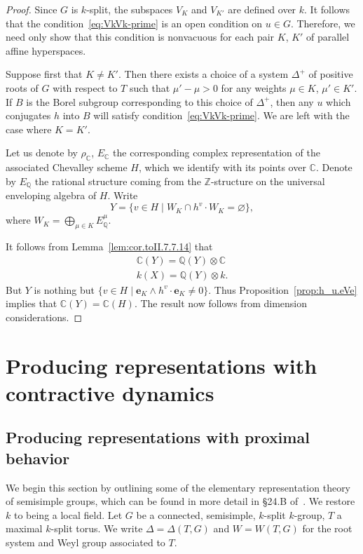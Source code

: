 \documentclass{amsart}
\theoremstyle{plain}
\theoremstyle{definition}
\theoremstyle{remark}
\newcommand{\Vect}[1]{\mathbold{#1}}
\begin{document}
\begin{proof}
Since $G$ is $k$-split, the subspaces $V_{K}$ and $V_{K'}$ are defined over $k$. It follows
that the condition~\eqref{eq:VkVk-prime} is an open condition on $u \in G$. Therefore,
we need only show that this condition is nonvacuous for each pair $K$, $K'$ of parallel
affine hyperspaces.

Suppose first that $K \neq K'$.
Then there exists a choice of a system $\Delta^{+}$ of positive roots of $G$ with respect
to $T$ such that $\mu' - \mu > 0$ for any weights $\mu \in K$, $\mu' \in K'$. If $B$ is the
Borel subgroup corresponding to this choice of $\Delta^{+}$, then any $u$ which
conjugates $h$ into $B$ will satisfy condition~\eqref{eq:VkVk-prime}. We are left with
the case where $K = K'$.

Let us denote by $\rho_{\mathbb{C}}$, $E_{\mathbb{C}}$ the corresponding complex
representation of the associated Chevalley scheme $H$, which we identify with its
points over $\mathbb{C}$. Denote by $E_{\mathbb{Q}}$ the rational structure coming
from the $\mathbb{Z}$-structure on the universal enveloping algebra of $H$.
Write $$Y = \{v \in H \mid W_{K} \cap h^{v} \cdot W_{K} = \varnothing\},$$
where $W_{K} = \bigoplus_{\mu \in K} E_{\mathbb{Q}}^{\mu}$.

It follows from Lemma~\ref{lem:cor.toII.7.7.14} that 
\begin{gather*}
\mathbb{C}(Y) = \mathbb{Q}(Y) \otimes \mathbb{C}\\
k(X) = \mathbb{Q}(Y) \otimes k.
\end{gather*}
But $Y$ is nothing but $\{v \in H \mid \Vect{e}_{K} \wedge h^{v} \cdot \Vect{e}_{K} \neq
0\}$. Thus Proposition~\ref{prop:h_u.eVe} implies that $\mathbb{C}(Y) =
\mathbb{C}(H)$. The result now follows from dimension considerations.
\end{proof}

\section{Producing representations with contractive
dynamics}\label{sec:ContractiveDynamics}
\subsection{Producing representations with proximal behavior}\label{sec:Pi-im}
We begin this section by outlining some of the elementary representation theory of
semisimple
groups, which can be found in more detail in \S24.B of~\cite{MR1102012}. 
We restore $k$ to being a local field.
Let $G$ be a connected, semisimple,
$k$-split $k$-group, $T$ a maximal $k$-split torus.
We write $\Delta =
\Delta(T, G)$ and $W = W(T, G)$ for the root system and Weyl group associated to $T$.
\end{document}
